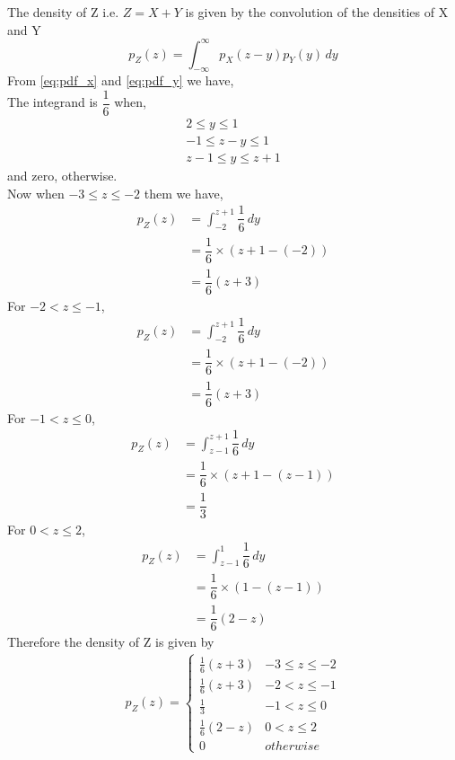 The density of Z i.e. $Z= X + Y $ is given by the convolution of the densities of X and Y
\begin{equation}
    p_Z(z) =  \int_{- \infty}^{\infty} p_X(z-y)p_Y(y) \,dy 
\end{equation}
From \ref{eq:pdf_x} and \ref{eq:pdf_y} we have, \\
The integrand is $\dfrac{1}{6}$ when,
\begin{align}
    2 \le y \le 1 \\
    -1 \le z-y \le 1 \\
    z-1 \le y \le z+1
\end{align}
and zero, otherwise. \\
Now when $-3 \le z \le -2$ them we have, 
\begin{align}
    p_Z(z) &=   \int_{-2}^{z+1} \dfrac{1}{6} \,dy  \\
          &= \dfrac{1}{6} \times ( z+1 - (-2)) \\
          &= \dfrac{1}{6}(z+3)
\end{align}
For $ -2 < z \le -1 $,
\begin{align}
    p_Z(z) &=   \int_{-2}^{z+1} \dfrac{1}{6} \,dy  \\
          &= \dfrac{1}{6} \times ( z+1 - (-2)) \\
          &= \dfrac{1}{6}(z+3)
\end{align}
For $ -1 < z \le 0 $,
\begin{align}
    p_Z(z) &=   \int_{z-1}^{z+1} \dfrac{1}{6} \,dy  \\
          &= \dfrac{1}{6} \times ( z+1 - (z-1)) \\
          &= \dfrac{1}{3}
\end{align}
For $ 0 < z \le 2$,
\begin{align}
    p_Z(z) &=   \int_{z-1}^{1} \dfrac{1}{6} \,dy  \\
          &= \dfrac{1}{6} \times ( 1- (z-1)) \\
          &= \dfrac{1}{6}(2-z)
\end{align}
Therefore the density of Z is given by
\begin{align}
\label{eq:pdf_z}
p_{Z}(z)  = 
\begin{cases}
\frac{1}{6}(z+3) & -3 \le z \le -2
\\
\frac{1}{6}(z+3) & -2 < z \le -1
\\
\frac{1}{3} & -1 < z \le 0
\\
\frac{1}{6}(2-z) & 0 < z \le 2
\\
0 & otherwise
\end{cases}
\end{align}
